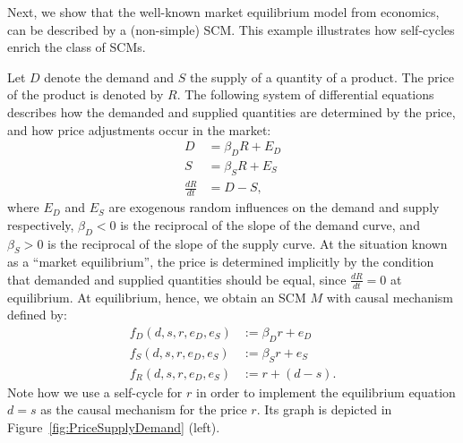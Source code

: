 Next, we show that the well-known market equilibrium model from economics, can be described by a (non-simple) SCM. 
This example illustrates how self-cycles enrich the class of SCMs.
\begin{Eg}
  \label{ex:PriceSupplyDemandDynamical}
Let $D$ denote the demand and $S$ the supply of a quantity of a product. The
price of the product is denoted by $R$. The following system of differential equations describes how the
demanded and supplied quantities are determined by the price, and how price
adjustments occur in the market:
$$
  \begin{aligned}
    D &= \beta_D R + E_D \\
    S &= \beta_S R + E_S \\
    \frac{dR}{dt} &= D - S,
  \end{aligned}
$$
where $E_D$ and $E_S$ are exogenous random influences on the demand and supply respectively, $\beta_D<0$ is the reciprocal of the slope of the demand curve, and $\beta_S>0$ is the reciprocal of the slope of the supply curve. At the situation known as a ``market equilibrium'', the price is determined implicitly by the condition that demanded and supplied quantities should be equal, since $\frac{dR}{dt}=0$ at equilibrium. 
At equilibrium, hence, we obtain an SCM $M$ with causal mechanism defined by:
$$
  \begin{aligned}
    f_D(d,s,r,e_D,e_S) &:= \beta_D r + e_D \\
    f_S(d,s,r,e_D,e_S) &:= \beta_S r + e_S \\
    f_R(d,s,r,e_D,e_S) &:= r + (d - s).
  \end{aligned}
$$
Note how we use a self-cycle for $r$ in order to implement the equilibrium
equation $d = s$ as the causal mechanism for the price $r$. 
Its graph is depicted in Figure~\ref{fig:PriceSupplyDemand} (left).
\begin{figure}\centering

\end{figure}
\end{Eg}
